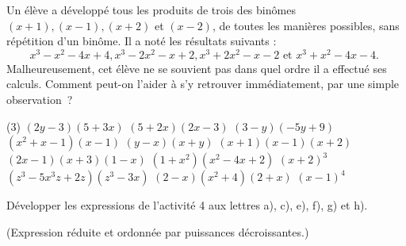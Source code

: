 \documentclass[a4paper,12pt]{report}
\begin{document}
\begin{core}
Un élève a développé tous les produits de trois des binômes $(x+1),(x-1),(x+2)$ et $(x-2)$, de toutes les manières possibles, sans répétition d'un binôme. Il a noté les résultats suivants :
$$
x^3-x^2-4 x+4, x^3-2 x^2-x+2, x^3+2 x^2-x-2 \text { et } x^3+x^2-4 x-4 \text {. }
$$
Malheureusement, cet élève ne se souvient pas dans quel ordre il a effectué ses calculs.
Comment peut-on l'aider à s'y retrouver immédiatement, par une simple observation~?
\end{core}
\begin{core}
	\phantom{}
\begin{tasks}(3)
\task $(2 y-3)(5+3 x)$
\task $(5+2 x)(2 x-3)$
\task $(3-y)(-5 y+9)$
\task $\left(x^2+x-1\right)(x-1)$
\task $(y-x)(x+y)$
\task $(x+1)(x-1)(x+2)$
\task $(2 x-1)(x+3)(1-x)$
\task $\left(1+x^2\right)\left(x^2-4 x+2\right)$
\task $(x+2)^3$
\task $\left(z^3-5 x^3 z+2 z\right)\left(z^3-3 x\right)$
\task $(2-x)\left(x^2+4\right)(2+x)$
\task $(x-1)^4$
\end{tasks}
\end{core}

\begin{core}
	Développer les expressions de l'activité 4 aux lettres a), c), e), f), g) et h). 

(Expression réduite et ordonnée par puissances décroissantes.)
\end{core}
\end{document}
